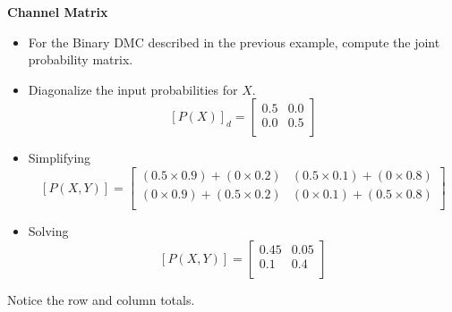 \documentclass[a4]{beamer}
\begin{document}
\noindent \textbf{Channel Matrix}
\begin{itemize}
\item For the Binary DMC described in the previous example, compute the joint probability matrix.
\item Diagonalize the input probabilities for $X$.
\[  [P(X)]_d  = \left[ \begin{array}{cc}
0.5 & 0.0  \\
0.0 & 0.5\\
\end{array} \right] \]

\item Simplifying
\[  [P(X,Y)]  =  \left[ \begin{array}{cc}
(0.5 \times 0.9)+(0 \times 0.2) & (0.5 \times 0.1)+(0 \times 0.8) \\
(0 \times 0.9)+(0.5 \times 0.2) & (0 \times 0.1)+(0.5 \times 0.8) \\
\end{array} \right]  \]


\item Solving
\[  [P(X,Y)]  =  \left[ \begin{array}{cc}
0.45 & 0.05 \\
0.1  & 0.4 \\
\end{array} \right]  \]
\end{itemize}
Notice the row and column totals.
\end{document}
